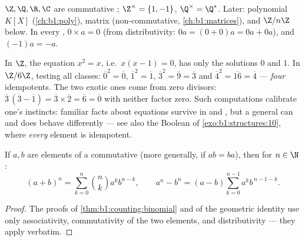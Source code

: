 \begin{example}\label{ex:b1:structures:rings}
$\Z, \Q, \R, \C$ are commutative ; $\Z^\times = \{1, -1\}$,
$\Q^\times = \Q^*$. Later: polynomial  $K[X]$
(\cref{ch:b1:poly}), matrix  (non-commutative,
\cref{ch:b1:matrices}), and $\Z/n\Z$ below. In every , $0 \times
a = 0$ (from distributivity: $0a = (0+0)a = 0a + 0a$), and
$(-1)a = -a$.
\end{example}

\begin{example}\label{ex:b1:structures:idempotents}
In $\Z$, the equation $x^2 = x$, i.e.\ $x(x - 1) = 0$, has only
the solutions $0$ and $1$. In $\Z/6\Z$, testing all classes:
$\overline0^2 = \overline0$, $\overline1^2 = \overline1$,
$\overline3^2 = \overline9 = \overline3$ and $\overline4^2 =
\overline{16} = \overline4$ --- \emph{four} idempotents. The two
exotic ones come from zero divisors: $\overline3\,(\overline3 -
\overline1) = \overline3 \times \overline2 = \overline6 =
\overline0$ with neither factor zero. Such computations calibrate
one's instincts: familiar facts about equations survive in
 and , but a general  can and does
behave differently --- see also the Boolean  of
\cref{exo:b1:structures:10}, where \emph{every} element is
idempotent.
\end{example}

\begin{proposition}\label{prop:b1:structures:binomial}
If $a, b$ are elements of a commutative  (more generally, if
$ab = ba$), then for $n \in \N$:
\[
(a+b)^n = \sum_{k=0}^n \binom nk a^k b^{n-k},
\qquad
a^n - b^n = (a - b) \sum_{k=0}^{n-1} a^k b^{\,n-1-k} .
\]
\end{proposition}

\begin{proof}
The proofs of \cref{thm:b1:counting:binomial} and of the geometric
identity use only associativity, commutativity of the two elements,
and distributivity --- they apply verbatim.
\end{proof}

